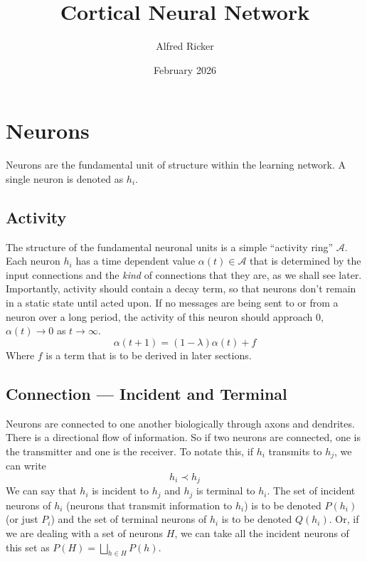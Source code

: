 \documentclass[11pt]{article}
\title{Cortical Neural Network}
\author{Alfred Ricker}
\date{February 2026}
\begin{document}
\maketitle
\section{Neurons}
Neurons are the fundamental unit of structure within the learning network. A single neuron is denoted as $h_i$.

\subsection{Activity}
The structure of the fundamental neuronal units is a simple ``activity ring'' $\mathcal{A}$. Each neuron $h_i$ has a time dependent value $\alpha(t) \in \mathcal{A}$ that is determined by the input connections and the \textit{kind} of connections that they are, as we shall see later.\\

Importantly, activity should contain a decay term, so that neurons don't remain in a static state until acted upon. If no messages are being sent to or from a neuron over a long period, the activity of this neuron should approach $0$, $\alpha(t) \to 0$ as $t \to \infty$.
\begin{equation}
    \alpha(t+1) = (1-\lambda)\alpha(t) + f
\end{equation}
Where $f$ is a term that is to be derived in later sections.

\subsection{Connection --- Incident and Terminal}
Neurons are connected to one another biologically through axons and dendrites. There is a directional flow of information. So if two neurons are connected, one is the transmitter and one is the receiver. To notate this, if $h_i$ transmits to $h_j$, we can write
\begin{equation}
    h_i \prec h_j
\end{equation}
We can say that $h_i$ is incident to $h_j$ and $h_j$ is terminal to $h_i$. The set of incident neurons of $h_i$ (neurons that transmit information to $h_i$) is to be denoted $P(h_i)$ (or just $P_i$) and the set of terminal neurons of $h_i$ is to be denoted $Q(h_i)$. Or, if we are dealing with a set of neurons $H$, we can take all the incident neurons of this set as $P(H) = \bigsqcup_{h \in H} P(h)$.\\
\end{document}

